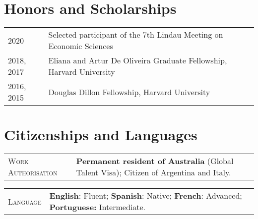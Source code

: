\documentclass[letterpaper,9pt]{article} %
\begin{document}


\section{Honors and Scholarships}
\begin{tabular}{>{\raggedleft\arraybackslash}p{}|p{}}
	\textsc{2020} & Selected participant of the 7th Lindau Meeting on Economic Sciences \\
	
	\textsc{2018, 2017} & Eliana and Artur De Oliveira Graduate Fellowship, Harvard University \\
	
	\textsc{2016, 2015} & Douglas Dillon Fellowship, Harvard University \\
	
\end{tabular}

\section{Citizenships and Languages}

\begin{tabular}[htb]{>{\raggedleft\arraybackslash}p{}|p{}}
 \textsc{Work Authorisation} & \textbf{Permanent resident of Australia} (Global Talent Visa); Citizen of Argentina and Italy. \\
\end{tabular}

\begin{tabular}[htb]{>{\raggedleft\arraybackslash}p{}|p{}}
	\textsc{Language} & \textbf{English}: Fluent; \textbf{Spanish}: Native; \textbf{French}: Advanced; \textbf{Portuguese:} Intermediate. \\
\end{tabular}
\end{document}
